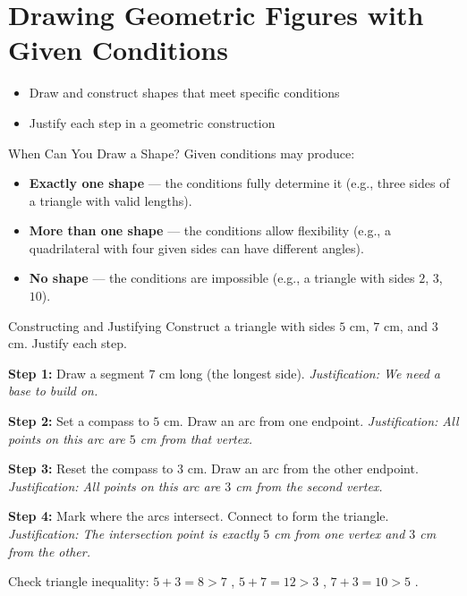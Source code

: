 \section{Drawing Geometric Figures with Given Conditions}

\begin{learningGoals}
\begin{itemize}
    \item Draw and construct shapes that meet specific conditions
    \item Justify each step in a geometric construction
\end{itemize}
\end{learningGoals}

\begin{conceptBox}{When Can You Draw a Shape?}
Given conditions may produce:
\begin{itemize}[leftmargin=*]
    \item \textbf{Exactly one shape} — the conditions fully determine it (e.g., three sides of a triangle with valid lengths).
    \item \textbf{More than one shape} — the conditions allow flexibility (e.g., a quadrilateral with four given sides can have different angles).
    \item \textbf{No shape} — the conditions are impossible (e.g., a triangle with sides $2$, $3$, $10$).
\end{itemize}
\end{conceptBox}

\begin{workedExample}{Constructing and Justifying}
Construct a triangle with sides $5$ cm, $7$ cm, and $3$ cm. Justify each step.

\textbf{Step 1:} Draw a segment $7$ cm long (the longest side). \textit{Justification: We need a base to build on.}

\textbf{Step 2:} Set a compass to $5$ cm. Draw an arc from one endpoint. \textit{Justification: All points on this arc are $5$ cm from that vertex.}

\textbf{Step 3:} Reset the compass to $3$ cm. Draw an arc from the other endpoint. \textit{Justification: All points on this arc are $3$ cm from the second vertex.}

\textbf{Step 4:} Mark where the arcs intersect. Connect to form the triangle. \textit{Justification: The intersection point is exactly $5$ cm from one vertex and $3$ cm from the other.}

Check triangle inequality: $5 + 3 = 8 > 7$ \checkmark, $5 + 7 = 12 > 3$ \checkmark, $7 + 3 = 10 > 5$ \checkmark.
\end{workedExample}

